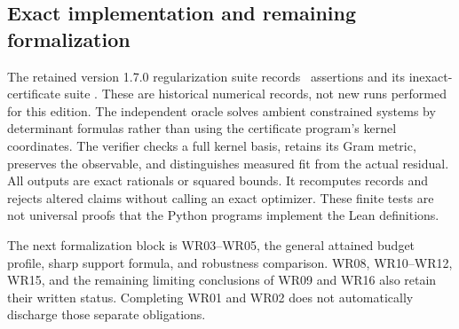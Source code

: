 \subsection{Exact implementation and remaining formalization}
The retained version 1.7.0 regularization suite records \EditionRegularizationChecks\ assertions and its inexact-certificate suite \EditionInexactChecks. These are historical numerical records, not new runs performed for this edition. The independent oracle solves ambient constrained systems by determinant formulas rather than using the certificate program's kernel coordinates. The verifier checks a full kernel basis, retains its Gram metric, preserves the observable, and distinguishes measured fit from the actual residual. All outputs are exact rationals or squared bounds. It recomputes records and rejects altered claims without calling an exact optimizer. These finite tests are not universal proofs that the Python programs implement the Lean definitions.

The next formalization block is WR03--WR05, the general attained budget profile, sharp support formula, and robustness comparison. WR08, WR10--WR12, WR15, and the remaining limiting conclusions of WR09 and WR16 also retain their written status. Completing WR01 and WR02 does not automatically discharge those separate obligations.

